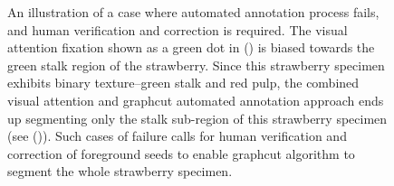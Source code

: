 \documentclass {udthesis}
\begin{document}
\begin{figure}
\begin{subfigure}[]{0.2\textwidth}
      \caption{}
      \label{fig:bad_seg_recursive_seg}
  \end{subfigure}
\caption[Illustration of a case where automated annotation process fails]{An illustration of a case where automated annotation process fails, and human verification and correction is required. The visual attention fixation shown as a green dot in () is biased towards the green stalk region of the strawberry. Since this strawberry specimen exhibits binary texture--green stalk and red pulp, the combined visual attention and graphcut automated annotation approach ends up segmenting only the stalk sub-region of this strawberry specimen (see ()). Such cases of failure calls for human verification and correction of foreground seeds to enable graphcut algorithm to segment the whole strawberry specimen.} 
\label{fig:annotation_bad_seg}
\end{figure}	
%
\end{document}
